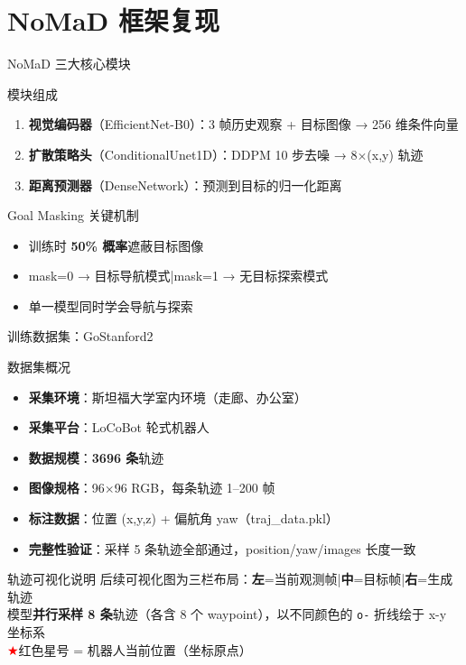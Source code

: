 \documentclass[aspectratio=169,10pt]{beamer}
\begin{document}
\section{NoMaD 框架复现}

\begin{frame}{NoMaD 三大核心模块}
\begin{block}{模块组成}
\begin{enumerate}
\item \textbf{视觉编码器}（EfficientNet-B0）：3 帧历史观察 + 目标图像 → 256 维条件向量
\item \textbf{扩散策略头}（ConditionalUnet1D）：DDPM 10 步去噪 → 8$\times$(x,y) 轨迹
\item \textbf{距离预测器}（DenseNetwork）：预测到目标的归一化距离
\end{enumerate}
\end{block}
\pause
\begin{exampleblock}{Goal Masking 关键机制}
\begin{itemize}
\item 训练时 \textbf{50\% 概率}遮蔽目标图像
\item mask=0 → 目标导航模式\quad|\quad mask=1 → 无目标探索模式
\item 单一模型同时学会导航与探索
\end{itemize}
\end{exampleblock}
\end{frame}

\begin{frame}{训练数据集：GoStanford2}
\begin{block}{数据集概况}
\begin{itemize}
\item \textbf{采集环境}：斯坦福大学室内环境（走廊、办公室）
\item \textbf{采集平台}：LoCoBot 轮式机器人
\item \textbf{数据规模}：\textbf{3696 条}轨迹
\item \textbf{图像规格}：96$\times$96 RGB，每条轨迹 1--200 帧
\item \textbf{标注数据}：位置 (x,y,z) + 偏航角 yaw（traj\_data.pkl）
\item \textbf{完整性验证}：采样 5 条轨迹全部通过，position/yaw/images 长度一致
\end{itemize}
\end{block}
\pause
\begin{block}{轨迹可视化说明}
{\small
后续可视化图为三栏布局：\textbf{左}=当前观测帧\;|\;\textbf{中}=目标帧\;|\;\textbf{右}=生成轨迹\\[1mm]
模型\textbf{并行采样 8 条}轨迹（各含 8 个 waypoint），以不同颜色的 {\normalfont\texttt{o-}} 折线绘于 x-y 坐标系\\[1mm]
\textcolor{red}{$\bigstar$}\;红色星号 = 机器人当前位置（坐标原点）
}
\end{block}
\end{frame}
\end{document}
